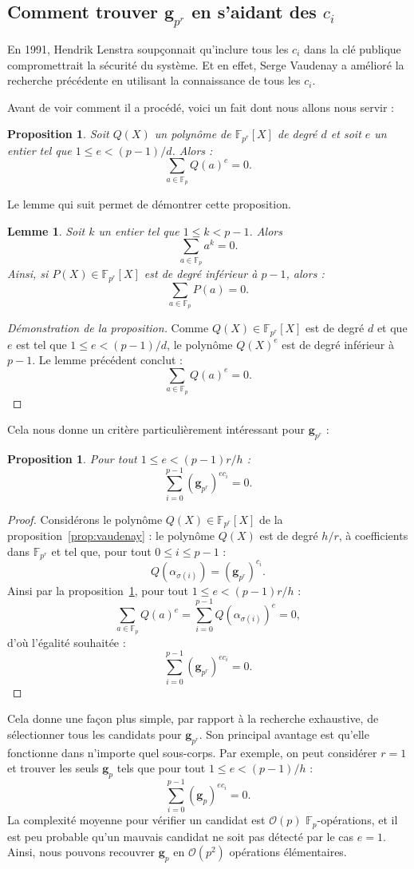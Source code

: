 \documentclass[a4paper, titlepage, 11pt]{article}
\newtheorem{lemm}[theo]{Lemme}
\newtheorem{prop}[theo]{Proposition}
\theoremstyle{definition}
\theoremstyle{remark}
\def\O{\mathcal O}
\def\gf #1{\mathbb{F}_{#1}}
\def\mbf #1{\mathbf{#1}}
\begin{document}
\subsection{Comment trouver $\mbf g_{p^r}$ en s'aidant des $c_i$}

En 1991, Hendrik Lenstra \cite{lenstra1991} soupçonnait qu'inclure tous les $c_i$ dans la clé publique compromettrait la sécurité du système. Et en effet, Serge Vaudenay a amélioré la recherche précédente en utilisant la connaissance de tous les $c_i$.

Avant de voir comment il a procédé, voici un fait dont nous allons nous servir :

\begin{prop}\label{prop:faitCool}
Soit $Q(X)$ un polynôme de $\gf{p^r}[X]$ de degré $d$ et soit $e$ un entier tel que $1 \leqslant e < (p-1)/d$. Alors : $$\sum_{a \in \gf{p}} Q(a)^e = 0.$$
\end{prop}
Le lemme qui suit permet de démontrer cette proposition.

\begin{lemm}
Soit $k$ un entier tel que $1 \leqslant k < p-1$. Alors
$$\sum_{a\in\gf{p}} a^k = 0.$$
Ainsi, si $P(X) \in \gf{p^r}[X]$ est de degré inférieur à $p-1$, alors : $$\sum_{a\in\gf{p}} P(a) = 0.$$
\end{lemm}

\begin{proof}[Démonstration de la proposition]
Comme $Q(X) \in \gf{p^r}[X]$ est de degré $d$ et que $e$ est tel que $1\leqslant e < (p-1)/d$, le polynôme $Q(X)^e$ est de degré inférieur à $p-1$. Le lemme précédent conclut :
$$\sum_{a\in\gf{p}} Q(a)^e = 0.$$
\end{proof}

Cela nous donne un critère particulièrement intéressant pour $\mbf g_{p^r}$ :
\begin{prop}
Pour tout $1 \leqslant e < (p-1)r/h$ :
$$\sum_{i=0}^{p-1} (\mbf g_{p^r})^{ec_i} = 0.$$
\end{prop}
\begin{proof}
Considérons le polynôme $Q(X)\in\gf{p^r}[X]$ de la proposition~\ref{prop:vaudenay} : le polynôme $Q(X)$ est de degré $h/r$, à coefficients dans $\gf{p^r}$ et tel que, pour tout $0 \leqslant i \leqslant p-1$ :
$$Q\left(\alpha_{\sigma(i)}\right) = (\mbf g_{p^r})^{c_i}.$$
Ainsi par la proposition~\ref{prop:faitCool}, pour tout $1 \leqslant e < (p-1)r/h$ :
$$\sum_{a\in\gf{p}} Q(a)^e = \sum_{i=0}^{p-1} Q\left(\alpha_{\sigma(i)}\right)^e = 0,$$
d'où l'égalité souhaitée :
$$\sum_{i=0}^{p-1} (\mbf g_{p^r})^{ec_i} = 0.$$
\end{proof}
\noindent Cela donne une façon plus simple, par rapport à la recherche exhaustive, de sélectionner tous les candidats pour $\mbf g_{p^r}$. Son principal avantage est qu'elle fonctionne dans n'importe quel sous-corps. Par exemple, on peut considérer $r=1$ et trouver les seuls $\mbf g_p$ tels que pour tout $1 \leqslant e < (p-1)/h$ :
$$\sum_{i=0}^{p-1} (\mbf g_p)^{ec_i} = 0.$$
La complexité moyenne pour vérifier un candidat est $\O(p)$ $\gf{p}$-opérations, et il est peu probable qu'un mauvais candidat ne soit pas détecté par le cas $e = 1$. Ainsi, nous pouvons recouvrer $\mbf g_p$ en $\O(p^2)$ opérations élémentaires.
\end{document}
